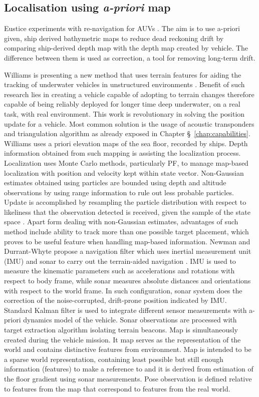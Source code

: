 \subsection{Localisation using \textit{a-priori} map}
Eustice experiments with re-navigation for AUVs \cite{eustice05towards}. The aim is to use a-priori given, ship derived bathymetric maps to reduce dead reckoning drift by comparing ship-derived depth map with the depth map created by vehicle. The difference between them is used as correction, a tool for removing long-term drift. 

Williams is presenting a new method that uses terrain features for aiding the tracking of underwater vehicles in unstructured environments \cite{williams06}. Benefit of such research lies in creating a vehicle capable of adopting to terrain changes therefore capable of being reliably deployed for longer time deep underwater, on a real task, with real environment. This work is revolutionary in solving the position update for a vehicle. Most common solution is the usage of acoustic transponders and triangulation algorithm as already exposed in Chapter \S~\ref{chap:capabilities}. Williams uses a priori elevation maps of the sea floor, recorded by ships. Depth information obtained from such mapping is assisting the localization process. Localization uses Monte Carlo methods, particularly PF, to manage map-based localization with position and velocity kept within state vector. Non-Gaussian estimates obtained using particles are bounded using depth and altitude observations by using range information to rule out less probable particles. Update is accomplished by resampling the particle distribution with respect to likeliness that the observation detected is received, given the sample of the state space \cite{williams06}. Apart form dealing with non-Gaussian estimates, advantages of such method include ability to track more than one possible target placement, which proves to be useful feature when handling map-based information.  
Newman and Durrant-Whyte propose a navigation filter which uses inertial measurement unit (IMU) and sonar to carry out the terrain-aided navigation \cite{newman98}. IMU is used to measure the kinematic parameters such as accelerations and rotations with respect to body frame, while sonar measures absolute distances and orientations with respect to the world frame. In such configuration, sonar system does the correction of the noise-corrupted, drift-prone position indicated by IMU. Standard Kalman filter is used to integrate different sensor measurements with a-priori dynamics model of the vehicle. Sonar observations are processed with target extraction algorithm isolating terrain beacons. Map is simultaneously created during the vehicle mission. It map serves as the representation of the world and contains distinctive features from environment. Map is intended to be a sparse world representation, containing least possible but still enough information (features) to make a reference to and it is derived from estimation of the floor gradient using sonar measurements. Pose observation is defined relative to features from the map that correspond to features from the real world.


